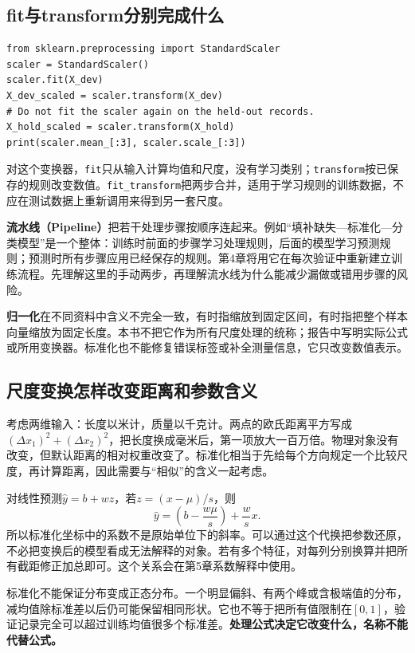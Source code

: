 
\subsection{fit与transform分别完成什么}
\begin{lstlisting}[caption={把学习尺度和应用尺度分成两步}]
from sklearn.preprocessing import StandardScaler
scaler = StandardScaler()
scaler.fit(X_dev)
X_dev_scaled = scaler.transform(X_dev)
# Do not fit the scaler again on the held-out records.
X_hold_scaled = scaler.transform(X_hold)
print(scaler.mean_[:3], scaler.scale_[:3])
\end{lstlisting}
对这个变换器，\texttt{fit}只从输入计算均值和尺度，没有学习类别；\texttt{transform}按已保存的规则改变数值。\texttt{fit\_transform}把两步合并，适用于学习规则的训练数据，不应在测试数据上重新调用来得到另一套尺度。

\textbf{流水线（Pipeline）}把若干处理步骤按顺序连起来。例如“填补缺失—标准化—分类模型”是一个整体：训练时前面的步骤学习处理规则，后面的模型学习预测规则；预测时所有步骤应用已经保存的规则。第4章将用它在每次验证中重新建立训练流程。先理解这里的手动两步，再理解流水线为什么能减少漏做或错用步骤的风险。

\textbf{归一化}在不同资料中含义不完全一致，有时指缩放到固定区间，有时指把整个样本向量缩放为固定长度。本书不把它作为所有尺度处理的统称；报告中写明实际公式或所用变换器。标准化也不能修复错误标签或补全测量信息，它只改变数值表示。

\subsection{尺度变换怎样改变距离和参数含义}
考虑两维输入：长度以米计，质量以千克计。两点的欧氏距离平方写成$(\Delta x_1)^2+(\Delta x_2)^2$，把长度换成毫米后，第一项放大一百万倍。物理对象没有改变，但默认距离的相对权重改变了。标准化相当于先给每个方向规定一个比较尺度，再计算距离，因此需要与“相似”的含义一起考虑。

对线性预测$\hat y=b+wz$，若$z=(x-\mu)/s$，则
\[
\hat y=\left(b-\frac{w\mu}{s}\right)+\frac{w}{s}x.
\]
所以标准化坐标中的系数不是原始单位下的斜率。可以通过这个代换把参数还原，不必把变换后的模型看成无法解释的对象。若有多个特征，对每列分别换算并把所有截距修正加总即可。这个关系会在第5章系数解释中使用。

标准化不能保证分布变成正态分布。一个明显偏斜、有两个峰或含极端值的分布，减均值除标准差以后仍可能保留相同形状。它也不等于把所有值限制在$[0,1]$，验证记录完全可以超过训练均值很多个标准差。\textbf{处理公式决定它改变什么，名称不能代替公式。}

